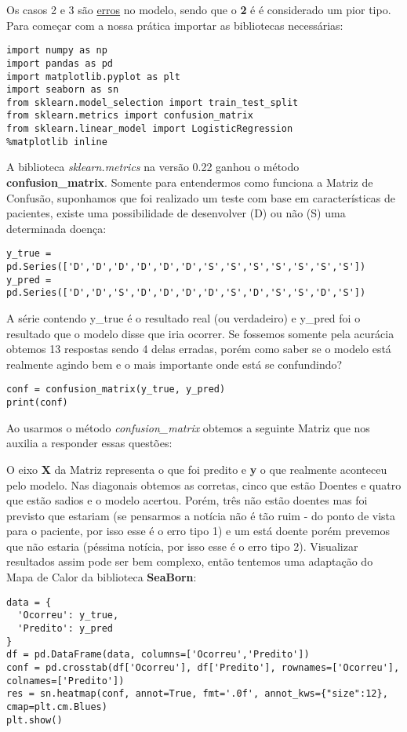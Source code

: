 Os casos 2 e 3 são \underline{erros} no modelo, sendo que o \textbf{2} é é considerado um pior tipo. Para começar com a nossa prática importar as bibliotecas necessárias:
\begin{lstlisting}[]
import numpy as np
import pandas as pd
import matplotlib.pyplot as plt
import seaborn as sn
from sklearn.model_selection import train_test_split
from sklearn.metrics import confusion_matrix
from sklearn.linear_model import LogisticRegression
%matplotlib inline
\end{lstlisting}

A biblioteca \textit{sklearn.metrics} na versão 0.22 ganhou o método \textbf{confusion\_matrix}. Somente para entendermos como funciona a Matriz de Confusão, suponhamos que foi realizado um teste com base em características de pacientes, existe uma possibilidade de desenvolver (D) ou não (S) uma determinada doença:
\begin{lstlisting}[]
y_true = pd.Series(['D','D','D','D','D','D','S','S','S','S','S','S','S'])
y_pred = pd.Series(['D','D','S','D','D','D','D','S','D','S','S','D','S'])
\end{lstlisting}

A série contendo y\_true é o resultado real (ou verdadeiro) e y\_pred foi o resultado que o modelo disse que iria ocorrer. Se fossemos somente pela acurácia obtemos 13 respostas sendo 4 delas erradas, porém como saber se o modelo está realmente agindo bem e o mais importante onde está se confundindo?
\begin{lstlisting}[]
conf = confusion_matrix(y_true, y_pred)
print(conf)
\end{lstlisting}

Ao usarmos o método \textit{confusion\_matrix} obtemos a seguinte Matriz que nos auxilia a responder essas questões: \\
\codigo{$[[$5 1$][$3 4$]]$}

O eixo \textbf{X} da Matriz representa o que foi predito e \textbf{y} o que realmente aconteceu pelo modelo. Nas diagonais obtemos as corretas, cinco que estão Doentes e quatro que estão sadios e o modelo acertou. Porém, três não estão doentes mas foi previsto que estariam (se pensarmos a notícia não é tão ruim - do ponto de vista para o paciente, por isso esse é o erro tipo 1) e um está doente porém prevemos que não estaria (péssima notícia, por isso esse é o erro tipo 2). Visualizar resultados assim pode ser bem complexo, então tentemos uma adaptação do Mapa de Calor da biblioteca \textbf{SeaBorn}:
\begin{lstlisting}[]
data = {
  'Ocorreu': y_true,
  'Predito': y_pred
}
df = pd.DataFrame(data, columns=['Ocorreu','Predito'])
conf = pd.crosstab(df['Ocorreu'], df['Predito'], rownames=['Ocorreu'], colnames=['Predito'])
res = sn.heatmap(conf, annot=True, fmt='.0f', annot_kws={"size":12}, cmap=plt.cm.Blues)
plt.show()
\end{lstlisting}

